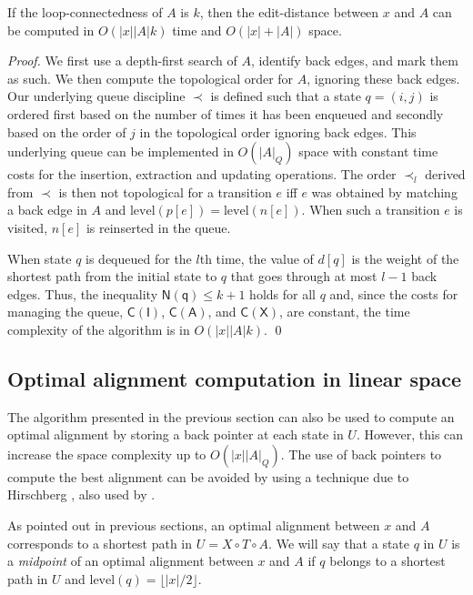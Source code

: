 \documentclass{llncs}
\newcommand{\0}{\overline{0}}
\newcommand{\1}{\overline{1}}
\newcommand{\+}{\oplus}
\renewcommand{\.}{\otimes}
\newcommand{\level}{\textrm{level}}
\newcommand{\floor}[1]{\lfloor #1 \rfloor}
\begin{document}
\begin{corollary}
  If the loop-connectedness of $A$ is $k$, then the edit-distance
  between $x$ and $A$ can be computed in $O(|x| |A| k)$ time and
  $O(|x| + |A|)$ space.
\end{corollary}
\begin{proof}
  We first use a depth-first search of $A$, identify back edges, and
  mark them as such. We then compute the topological order for $A$,
  ignoring these back edges.  Our underlying queue discipline $\prec$
  is defined such that a state $q = (i,j)$ is ordered first based on
  the number of times it has been enqueued and secondly based on the
  order of $j$ in the topological order ignoring back edges. This
  underlying queue can be implemented in $O(|A|_Q)$ space with
  constant time costs for the insertion, extraction and updating
  operations. The order $\prec_l$ derived from $\prec$ is then not
  topological for a transition $e$ iff $e$ was obtained by matching a
  back edge in $A$ and $\level(p[e]) = \level(n[e])$. When such a
  transition $e$ is visited, $n[e]$ is reinserted in the queue.

  When state $q$ is dequeued for the $l$th time, the value of $d[q]$
  is the weight of the shortest path from the initial state to $q$
  that goes through at most $l - 1$ back edges.  Thus, the inequality
  $\mathsf{N(q)} \le k + 1$ holds for all $q$ and, since the costs for
  managing the queue, $\mathsf{C(I)}$, $\mathsf{C(A)}$, and
  $\mathsf{C(X)}$, are constant, the time complexity of the algorithm
  is in $O(|x| |A| k)$.  \qed
\end{proof}


\subsection{Optimal alignment computation in linear space}

The algorithm presented in the previous section can also be used to
compute an optimal alignment by storing a back pointer at each state
in $U$. However, this can increase the space complexity up to $O(|x|
|A|_Q)$.  The use of back pointers to compute the best alignment can
be avoided by using a technique due to Hirschberg \cite{hirschberg},
also used by \cite{myers-miller88,myers-miller89}.

As pointed out in previous sections, an optimal alignment between $x$
and $A$ corresponds to a shortest path in $U = X \circ T \circ A$.
We will say that a state $q$ in $U$ is a {\em midpoint} of an optimal
alignment between $x$ and $A$ if $q$ belongs to a shortest path in
$U$ and $\level(q) = \floor{|x|/2}$.
\end{document}
